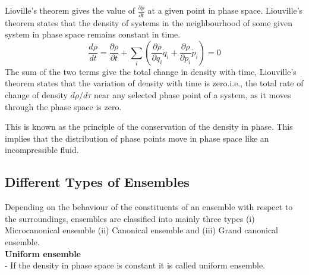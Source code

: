 Lioville's theorem gives the value of $\frac{\partial \rho}{\partial t}$ at a given point in phase space.
Liouville's theorem states that the density of systems in the neighbourhood of some given system in phase space remains constant in time.
\begin{equation}
\frac{d \rho}{d t}=\frac{\partial \rho}{\partial t}+\sum_{i}\left(\frac{\partial \rho}{\partial q_{i}} \dot{q}_{i}+\frac{\partial \rho}{\partial p_{i}} \dot{p}_{i}\right)=0
\end{equation}
The sum of the two terms give the total change in density with time, Liouville's theorem states that the variation of density with time is zero.i.e., the total rate of change of density $d\rho/d\tau$ near any selected phase point of a system, as it moves through the phase space is zero.

This is known as the principle of the conservation of the density in phase.  This implies that the distribution of phase points move in phase space like an incompressible fluid.\\
\subsection{Different Types of Ensembles}
Depending on the behaviour of the constituents of an ensemble with respect to the surroundings, ensembles are classified into mainly three types (i) Microcanonical ensemble (ii) Canonical ensemble and (iii) Grand canonical ensemble.\\
\textbf{Uniform ensemble}\\
- If the density in phase space is constant it is called uniform ensemble.

